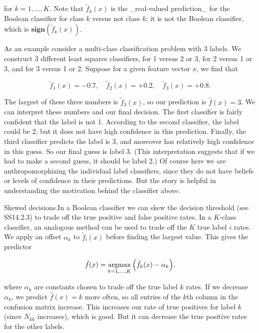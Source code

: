 for \(k=1,\ldots,K\). Note that \(\tilde{f}_{k}(x)\) is the _real-valued prediction_ for the Boolean classifier for class \(k\) versus not class \(k\); it is not the Boolean classifier, which is \(\mathbf{sign}(\tilde{f}_{k}(x))\).

As an example consider a multi-class classification problem with 3 labels. We construct 3 different least squares classifiers, for 1 versus 2 or 3, for 2 versus 1 or 3, and for 3 versus 1 or 2. Suppose for a given feature vector \(x\), we find that

\[\tilde{f}_{1}(x)=-0.7,\quad\tilde{f}_{2}(x)=+0.2,\quad\tilde{f}_{3}(x)=+0.8.\]

The largest of these three numbers is \(\tilde{f}_{3}(x)\), so our prediction is \(\hat{f}(x)=3\). We can interpret these numbers and our final decision. The first classifier is fairly confident that the label is not 1. According to the second classifier, the label could be 2, but it does not have high confidence in this prediction. Finally, the third classifier predicts the label is 3, and moreover has relatively high confidence in this guess. So our final guess is label 3. (This interpretation suggests that if we had to make a second guess, it should be label 2.) Of course here we are anthropomorphizing the individual label classifiers, since they do not have beliefs or levels of confidence in their predictions. But the story is helpful in understanding the motivation behind the classifier above.

Skewed decisions.In a Boolean classifier we can skew the decision threshold (see SS14.2.3) to trade off the true positive and false positive rates. In a \(K\)-class classifier, an analogous method can be used to trade off the \(K\) true label \(i\) rates. We apply an offset \(\alpha_{k}\) to \(\tilde{f}_{l}(x)\) before finding the largest value. This gives the predictor

\[\hat{f}(x)=\operatorname*{argmax}_{k=1,\ldots,K}\Big{(}\tilde{f}_{k}(x)- \alpha_{k}\Big{)},\]

where \(\alpha_{k}\) are constants chosen to trade off the true label \(k\) rates. If we decrease \(\alpha_{k}\), we predict \(\hat{f}(x)=k\) more often, so all entries of the \(k\)th column in the confusion matrix increase. This increases our rate of true positives for label \(k\) (since \(N_{kk}\) increases), which is good. But it can decrease the true positive rates for the other labels.

